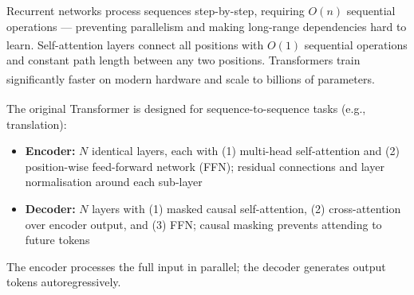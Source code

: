 \begin{tcbitemize}[ skin=sectionraster ]
    \tcbitem[title={Why Transformers Replaced RNNs}, raster multicolumn=3]
    Recurrent networks process sequences step-by-step, requiring $O(n)$ sequential operations --- preventing parallelism and making long-range dependencies hard to learn\textsuperscript{\cite[][p.~6]{vaswaniAttentionAllYou2023}}.
    Self-attention layers connect all positions with $O(1)$ sequential operations and constant path length between any two positions.
    Transformers train significantly faster on modern hardware and scale to billions of parameters\textsuperscript{\cite[][p.~93]{fleuretLittleBookDeep}}.

    \tcbitem[title={Encoder--Decoder Structure}, raster multicolumn=3]
    The original Transformer\textsuperscript{\cite[][p.~2]{vaswaniAttentionAllYou2023}} is designed for sequence-to-sequence tasks (e.g., translation):
    \begin{itemize}
        \item \textbf{Encoder:} $N$ identical layers, each with (1) multi-head self-attention and (2) position-wise feed-forward network (FFN); residual connections and layer normalisation around each sub-layer
        \item \textbf{Decoder:} $N$ layers with (1) masked causal self-attention, (2) cross-attention over encoder output, and (3) FFN; causal masking prevents attending to future tokens
    \end{itemize}

    \tcbitem[title={Transformer Block Diagram}, raster multicolumn=6]
    The encoder processes the full input in parallel; the decoder generates output tokens autoregressively.
    \tcblower
    \begin{center}
\end{center}
\end{tcbitemize}
